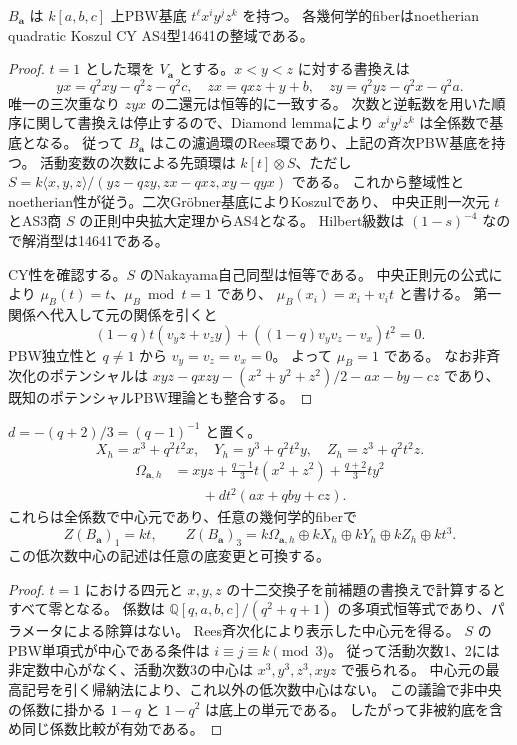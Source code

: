 \begin{lemma}[全係数PBWとCY包絡]\label{lem:triangle-deform-PBW}
$B_{\boldsymbol a}$ は $k[a,b,c]$ 上PBW基底
$t^\ell x^iy^jz^k$ を持つ。
各幾何学的fiberはnoetherian quadratic Koszul CY AS4型14641の整域である。
\end{lemma}
\begin{proof}
$t=1$ とした環を $V_{\boldsymbol a}$ とする。$x<y<z$ に対する書換えは
\[
 yx=q^2xy-q^2z-q^2c,\quad zx=qxz+y+b,\quad
 zy=q^2yz-q^2x-q^2a.
\]
唯一の三次重なり $zyx$ の二還元は恒等的に一致する。
次数と逆転数を用いた順序に関して書換えは停止するので、Diamond lemmaにより
$x^iy^jz^k$ は全係数で基底となる。
従って $B_{\boldsymbol a}$ はこの濾過環のRees環であり、上記の斉次PBW基底を持つ。
活動変数の次数による先頭環は $k[t]\otimes S$、ただし
$S=k\langle x,y,z\rangle/(yz-qzy,zx-qxz,xy-qyx)$ である。
これから整域性とnoetherian性が従う。二次Gr\"obner基底によりKoszulであり、
中央正則一次元 $t$ とAS3商 $S$ の正則中央拡大定理\cite{LBS}からAS4となる。
Hilbert級数は $(1-s)^{-4}$ なので解消型は14641である。

CY性を確認する。$S$ のNakayama自己同型は恒等である。
中央正則元の公式\cite[Lemma 1.5]{RRZ}により
$\mu_B(t)=t$、$\mu_B\bmod t=1$ であり、
$\mu_B(x_i)=x_i+v_it$ と書ける。
第一関係へ代入して元の関係を引くと
\[
 (1-q)t(v_yz+v_zy)+((1-q)v_yv_z-v_x)t^2=0.
\]
PBW独立性と $q\ne1$ から $v_y=v_z=v_x=0$。
よって $\mu_B=1$ である。
なお非斉次化のポテンシャルは
$xyz-qxzy-(x^2+y^2+z^2)/2-ax-by-cz$ であり、
既知のポテンシャルPBW理論とも整合する。
\end{proof}

\begin{lemma}[五つの中心三次元の全係数持上げ]
\label{lem:triangle-deform-center}
$d=-(q+2)/3=(q-1)^{-1}$ と置く。
\[
 X_h=x^3+q^2t^2x,\quad Y_h=y^3+q^2t^2y,\quad Z_h=z^3+q^2t^2z.
\]
\begin{align*}
 \Omega_{\boldsymbol a,h}
 &=xyz+\frac{q-1}{3}t(x^2+z^2)+\frac{q+2}{3}ty^2\\
 &\qquad+dt^2(ax+qby+cz).
\end{align*}
これらは全係数で中心元であり、任意の幾何学的fiberで
\[
 Z(B_{\boldsymbol a})_1=kt,\qquad
 Z(B_{\boldsymbol a})_3=
 k\Omega_{\boldsymbol a,h}\oplus kX_h\oplus kY_h\oplus kZ_h\oplus kt^3.
\]
この低次数中心の記述は任意の底変更と可換する。
\end{lemma}
\begin{proof}
$t=1$ における四元と $x,y,z$ の十二交換子を前補題の書換えで計算するとすべて零となる。
係数は $\mathbb Q[q,a,b,c]/(q^2+q+1)$ の多項式恒等式であり、パラメータによる除算はない。
Rees斉次化により表示した中心元を得る。
$S$ のPBW単項式が中心である条件は $i\equiv j\equiv k\pmod3$。
従って活動次数1、2には非定数中心がなく、活動次数3の中心は
$x^3,y^3,z^3,xyz$ で張られる。
中心元の最高記号を引く帰納法により、これ以外の低次数中心はない。
この議論で非中央の係数に掛かる $1-q$ と $1-q^2$ は底上の単元である。
したがって非被約底を含め同じ係数比較が有効である。
\end{proof}

